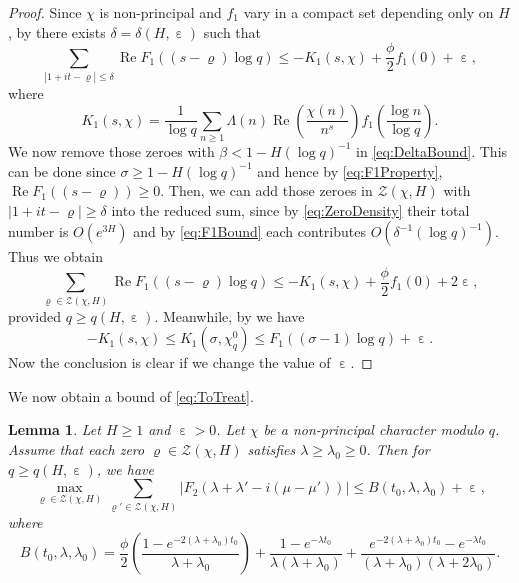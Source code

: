 \documentclass[10pt, reqno]{amsart}
\numberwithin{equation}{section}
\newtheorem{lemma}[theorem]{Lemma}
\renewcommand{\Re}{\operatorname{Re}}
\newcommand{\bb}[1]{\left(#1\right)}
\renewcommand{\epsilon }{\operatorname{\varepsilon}}
\renewcommand{\rho }{\operatorname{\varrho}}
\begin{document}
\begin{proof}
Since $\chi$ is non-principal and $f_1$ vary in a compact set depending only on $H$, by \cite[Lemma 5.2]{Heath-Brown} there exists $\delta=\delta(H,\epsilon)$ such that
\begin{equation}\label{eq:DeltaBound}
\sum_{|1+it-\rho|\leq \delta} \Re F_1((s-\rho)\log q)\leq -K_1(s,\chi)+\frac{\phi}{2}f_1(0)+\epsilon,
\end{equation}
where
\begin{equation}\label{eq:K1}
K_1(s,\chi)=\frac{1}{\log q}\sum_{n\geq 1}\Lambda(n)\Re\bb{\frac{\chi(n)}{n^s}}f_1\bb{\frac{\log n}{\log q}}.
\end{equation}
We now remove those zeroes with $\beta<1-H(\log q)^{-1}$ in \eqref{eq:DeltaBound}. This can be done since $\sigma \geq 1-H(\log q)^{-1}$ and hence by \eqref{eq:F1Property}, $\Re F_1((s-\rho))\geq 0$. Then, we can add those zeroes in $\mathcal{Z}(\chi,H)$ with $|1+it-\rho|\geq \delta$ into the reduced sum, since by \eqref{eq:ZeroDensity} their total number is $O(e^{3H})$ and by \eqref{eq:F1Bound} each contributes $O(\delta^{-1}(\log q)^{-1})$. Thus we obtain
\begin{equation}\label{eq:Intermediate}
\sum_{\rho \in \mathcal{Z}(\chi,H)} \Re F_1((s-\rho)\log q)\leq -K_1(s,\chi)+\frac{\phi}{2}f_1(0)+2\epsilon,
\end{equation}
provided $q\geq q(H,\epsilon)$. Meanwhile, by \cite[Lemma 5.3]{Heath-Brown} we have
\begin{equation}\label{eq:K1Bound}
-K_1(s,\chi)\leq K_1(\sigma,\chi_q^0)\leq F_1((\sigma-1)\log q)+\epsilon.
\end{equation}
Now the conclusion is clear if we change the value of $\epsilon$.
\end{proof}

We now obtain a bound of \eqref{eq:ToTreat}.

\begin{lemma}\label{lem:2}
Let $H\geq 1$ and $\epsilon>0$. Let $\chi$ be a non-principal character modulo $q$. Assume that each zero $\rho \in \mathcal{Z}(\chi,H)$ satisfies $\lambda\geq \lambda_0\geq 0$. Then for $q\geq q(H,\epsilon)$, we have
\begin{equation}\label{eq:lem2Result}
\max_{\rho \in \mathcal{Z}(\chi,H)} \sum_{\rho' \in \mathcal{Z}(\chi, H)} |F_2(\lambda +\lambda'-i(\mu-\mu'))| \leq B(t_0,\lambda,\lambda_0)+\epsilon,
\end{equation}
where
\begin{equation}\label{eq:B}
B(t_0,\lambda,\lambda_0)=\frac{\phi}{2}\bb{\frac{1-e^{-2(\lambda+\lambda_0)t_0}}{\lambda+\lambda_0}}+\frac{1-e^{-\lambda t_0}}{\lambda (\lambda+\lambda_0)}+\frac{e^{-2(\lambda+\lambda_0)t_0}-e^{-\lambda t_0}}{(\lambda+\lambda_0)(\lambda+2\lambda_0)}.
\end{equation}
\end{lemma}
\end{document}
